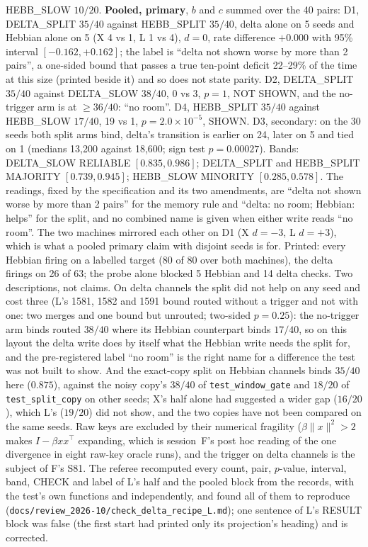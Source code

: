 \documentclass[11pt]{article}
\begin{document}
HEBB\_SLOW $10/20$. \textbf{Pooled, primary}, $b$ and $c$ summed over the 40 pairs: D1, DELTA\_SPLIT $35/40$ against HEBB\_SPLIT $35/40$, delta alone on 5 seeds and Hebbian alone on 5 (X 4 vs 1, L 1 vs 4), $d = 0$, rate difference $+0.000$ with 95\% interval $[-0.162, +0.162]$; the label is ``delta not shown worse by more than 2 pairs'', a one-sided bound that passes a true ten-point deficit 22--29\% of the time at this size (printed beside it) and so does not state parity. D2, DELTA\_SPLIT $35/40$ against DELTA\_SLOW $38/40$, 0 vs 3, $p = 1$, NOT SHOWN, and the no-trigger arm is at $\geq 36/40$: ``no room''. D4, HEBB\_SPLIT $35/40$ against HEBB\_SLOW $17/40$, 19 vs 1, $p = 2.0\times10^{-5}$, SHOWN. D3, secondary: on the 30 seeds both split arms bind, delta's transition is earlier on 24, later on 5 and tied on 1 (medians 13{,}200 against 18{,}600; sign test $p = 0.00027$). Bands: DELTA\_SLOW RELIABLE $[0.835, 0.986]$; DELTA\_SPLIT and HEBB\_SPLIT MAJORITY $[0.739, 0.945]$; HEBB\_SLOW MINORITY $[0.285, 0.578]$. The readings, fixed by the specification and its two amendments, are ``delta not shown worse by more than 2 pairs'' for the memory rule and ``delta: no room; Hebbian: helps'' for the split, and no combined name is given when either write reads ``no room''. The two machines mirrored each other on D1 (X $d = -3$, L $d = +3$), which is what a pooled primary claim with disjoint seeds is for. Printed: every Hebbian firing on a labelled target (80 of 80 over both machines), the delta firings on 26 of 63; the probe alone blocked 5 Hebbian and 14 delta checks. Two descriptions, not claims. On delta channels the split did not help on any seed and cost three (L's 1581, 1582 and 1591 bound routed without a trigger and not with one: two merges and one bound but unrouted; two-sided $p = 0.25$): the no-trigger arm binds routed $38/40$ where its Hebbian counterpart binds $17/40$, so on this layout the delta write does by itself what the Hebbian write needs the split for, and the pre-registered label ``no room'' is the right name for a difference the test was not built to show. And the exact-copy split on Hebbian channels binds $35/40$ here ($0.875$), against the noisy copy's $38/40$ of \texttt{test\_window\_gate} and $18/20$ of \texttt{test\_split\_copy} on other seeds; X's half alone had suggested a wider gap ($16/20$), which L's ($19/20$) did not show, and the two copies have not been compared on the same seeds. Raw keys are excluded by their numerical fragility ($\beta\|x\|^2 > 2$ makes $I - \beta x x^\top$ expanding, which is session~F's post hoc reading of the one divergence in eight raw-key oracle runs), and the trigger on delta channels is the subject of F's S81. The referee recomputed every count, pair, $p$-value, interval, band, CHECK and label of L's half and the pooled block from the records, with the test's own functions and independently, and found all of them to reproduce (\texttt{docs/review\_2026-10/check\_delta\_recipe\_L.md}); one sentence of L's RESULT block was false (the first start had printed only its projection's heading) and is corrected.
\end{document}
